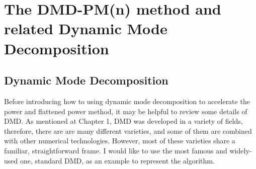 \cleardoublepage

\chapter{The DMD-PM(n) method and related Dynamic Mode Decomposition}
\label{chapter:DMD-PM}
\section{Dynamic Mode Decomposition}
Before introducing how to using dynamic mode decomposition to accelerate the power and flattened power method, it may be helpful to review some details of DMD.
As mentioned at Chapter 1, DMD was developed in a variety of fields, therefore, there are are many different varieties, and some of them are combined with other numerical technologies. 
However, most of these varieties share a familiar, straightforward frame. I would like to use the most famous and widely-used one, standard DMD, as an example to represent the algorithm.

